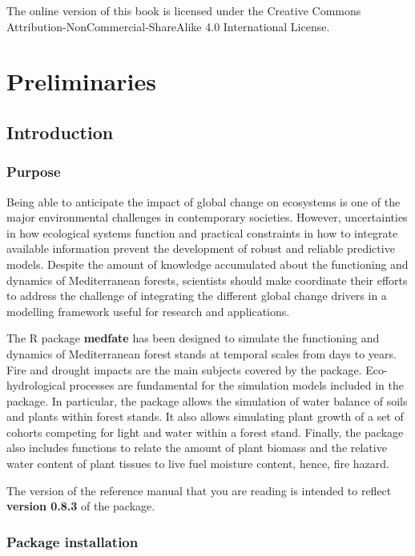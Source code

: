 \documentclass[]{book}
\begin{document}
The online version of this book is licensed under the Creative Commons
Attribution-NonCommercial-ShareAlike 4.0 International License.

\part{Preliminaries}\label{part-preliminaries}

\chapter{Introduction}\label{intro}

\section{Purpose}\label{purpose}

Being able to anticipate the impact of global change on ecosystems is
one of the major environmental challenges in contemporary societies.
However, uncertainties in how ecological systems function and practical
constraints in how to integrate available information prevent the
development of robust and reliable predictive models. Despite the amount
of knowledge accumulated about the functioning and dynamics of
Mediterranean forests, scientists should make coordinate their efforts
to address the challenge of integrating the different global change
drivers in a modelling framework useful for research and applications.

The R package \textbf{medfate} has been designed to simulate the
functioning and dynamics of Mediterranean forest stands at temporal
scales from days to years. Fire and drought impacts are the main
subjects covered by the package. Eco-hydrological processes are
fundamental for the simulation models included in the package. In
particular, the package allows the simulation of water balance of soils
and plants within forest stands. It also allows simulating plant growth
of a set of cohorts competing for light and water within a forest stand.
Finally, the package also includes functions to relate the amount of
plant biomass and the relative water content of plant tissues to live
fuel moisture content, hence, fire hazard.

The version of the reference manual that you are reading is intended to
reflect \textbf{version 0.8.3} of the package.

\section{Package installation}\label{package-installation}
\end{document}
